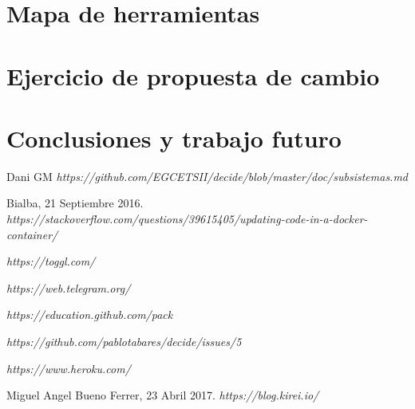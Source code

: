 \documentclass[12pt]{article}
\begin{document}
\section{Mapa de herramientas}


\section{Ejercicio de propuesta de cambio}
\section{Conclusiones y trabajo futuro}

\newpage	


\begin{thebibliography}{9}
Dani GM
\textit
{https://github.com/EGCETSII/decide/blob/master/doc/subsistemas.md}

Bialba, 21 Septiembre 2016. 
\textit{https://stackoverflow.com/questions/39615405/updating-code-in-a-docker-container/}

\textit{https://toggl.com/}

\textit{https://web.telegram.org/}

\textit{https://education.github.com/pack}

\textit{https://github.com/pablotabares/decide/issues/5}

\textit{https://www.heroku.com/}

Miguel Angel Bueno Ferrer, 23 Abril 2017. 
\textit{https://blog.kirei.io/}





\end{thebibliography}
\end{document}
